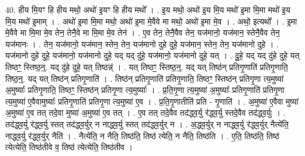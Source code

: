\documentclass[17pt]{extarticle}
\begin{document}
40. हीय मि॒यꣳ हि हीय मथो॒ अथो॑ इ॒यꣳ हि हीय मथो᳚ । . इ॒य मथो॒ अथो॑ इ॒य मि॒य मथो॑ इ॒मा मि॒मा मथो॑ इ॒य मि॒य मथो॑ इ॒माम् । . अथो॑ इ॒मा मि॒मा मथो॒ अथो॑ इ॒मा मे॒वैवे मा मथो॒ अथो॑ इ॒मा मे॒व । . अथो॒ इत्यथो᳚ । . इ॒मा मे॒वैवे मा मि॒मा मे॒व तेन॒ तेनै॒वे मा मि॒मा मे॒व तेन॑ । . ए॒व तेन॒ तेनै॒वैव तेन॒ यज॑मानो॒ यज॑मान॒ स्तेनै॒वैव तेन॒ यज॑मानः । . तेन॒ यज॑मानो॒ यज॑मान॒ स्तेन॒ तेन॒ यज॑मानो दुहे दुहे॒ यज॑मान॒ स्तेन॒ तेन॒ यज॑मानो दुहे । . यज॑मानो दुहे दुहे॒ यज॑मानो॒ यज॑मानो दुहे॒ यद् यद् दु॑हे॒ यज॑मानो॒ यज॑मानो दुहे॒ यत् । . दु॒हे॒ यद् यद् दु॑हे दुहे॒ यत् तिष्ठꣳ॒॒ स्तिष्ठ॒न्॒. यद् दु॑हे दुहे॒ यत् तिष्ठन्न्॑ । . यत् तिष्ठꣳ॒॒ स्तिष्ठ॒न्॒. यद् यत् तिष्ठ॑न् प्रतिगृ॒णाति॑ प्रतिगृ॒णाति॒ तिष्ठ॒न्॒. यद् यत् तिष्ठ॑न् प्रतिगृ॒णाति॑ । . तिष्ठ॑न् प्रतिगृ॒णाति॑ प्रतिगृ॒णाति॒ तिष्ठꣳ॒॒ स्तिष्ठ॑न् प्रतिगृ॒णा त्य॒मुष्या॑ अ॒मुष्याः᳚ प्रतिगृ॒णाति॒ तिष्ठꣳ॒॒ स्तिष्ठ॑न् प्रतिगृ॒णा त्य॒मुष्याः᳚ । . प्र॒ति॒गृ॒णा त्य॒मुष्या॑ अ॒मुष्याः᳚ प्रतिगृ॒णाति॑ प्रतिगृ॒णा त्य॒मुष्या॑ ए॒वैवामुष्याः᳚ प्रतिगृ॒णाति॑ प्रतिगृ॒णा त्य॒मुष्या॑ ए॒व । . प्र॒ति॒गृ॒णातीति॑ प्रति - गृ॒णाति॑ । . अ॒मुष्या॑ ए॒वैवा मुष्या॑ अ॒मुष्या॑ ए॒व तत् तदे॒वा मुष्या॑ अ॒मुष्या॑ ए॒व तत् । . ए॒व तत् तदे॒वैव तद॑द्ध्व॒र्यु र॑द्ध्व॒र्यु स्तदे॒वैव तद॑द्ध्व॒र्युः । . तद॑द्ध्व॒र्यु र॑द्ध्व॒र्यु स्तत् तद॑द्ध्व॒र्युर् न नाद्ध्व॒र्यु स्तत् तद॑द्ध्व॒र्युर् न । . अ॒द्ध्व॒र्युर् न नाद्ध्व॒र्यु र॑द्ध्व॒र्युर् नैत्ये॑ति॒ नाद्ध्व॒र्यु र॑द्ध्व॒र्युर् नैति॑ । . नैत्ये॑ति॒ न नैति॒ तिष्ठ॑ति॒ तिष्ठ॑ त्येति॒ न नैति॒ तिष्ठ॑ति । . ए॒ति॒ तिष्ठ॑ति॒ तिष्ठ॑ त्येत्येति॒ तिष्ठ॑तीवे व॒ तिष्ठ॑ त्येत्येति॒ तिष्ठ॑तीव । \newline
\pagebreak
{}
\end{document}
